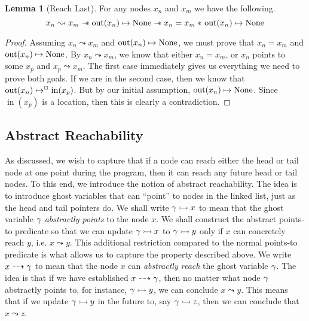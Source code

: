 \documentclass[a4paper, 10pt]{report}
\theoremstyle{definition}
\newtheorem{lemma}[theorem]{Lemma}
\newcommand{\nIn}[1]{\operatorname{in}(#1)}
\newcommand{\nOut}[1]{\operatorname{out}(#1)}
\newcommand{\node}{x}
\newcommand{\nodeM}[1]{\node_{#1}}
\newcommand{\reach}[2]{#1 \leadsto #2}
\newcommand{\ar}[2]{#1 \dashrightarrow #2}
\newcommand{\ap}[2]{#1 \rightarrowtail #2}
\begin{document}
\begin{lemma}[Reach Last]\label{lemma:reach-last}
  For any nodes $\nodeM{n}$ and $\nodeM{m}$ we have the following.
  \begin{equation*}
    \reach{\nodeM{n}}{\nodeM{m}} \wand \nOut{\nodeM{n}} \mapsto \None \wand \nodeM{n} = \nodeM{m} \star{} \nOut{\nodeM{n}} \mapsto \None
  \end{equation*}
\end{lemma}
\begin{proof}
  Assuming $\reach{\nodeM{n}}{\nodeM{m}}$ and $\nOut{\nodeM{n}} \mapsto \None$, we must prove that $\nodeM{n} = \nodeM{m}$ and $\nOut{\nodeM{n}} \mapsto \None$.
  By $\reach{\nodeM{n}}{\nodeM{m}}$, we know that either $\nodeM{n} = \nodeM{m}$, or $\nodeM{n}$ points to some $\nodeM{p}$ and $\reach{\nodeM{p}}{\nodeM{m}}$. The first case immediately gives us everything we need to prove both goals. If we are in the second case, then we know that $\nOut{\nodeM{n}} \mapsto^{\persistently} \nIn{\nodeM{p}}$. But by our initial assumption, $\nOut{\nodeM{n}} \mapsto \None$. Since $\nIn{\nodeM{p}}$ is a location, then this is clearly a contradiction.
\end{proof}


\subsection{Abstract Reachability}

As discussed, we wish to capture that if a node can reach either the head or tail node at one point during the program, then it can reach any future head or tail nodes. To this end, we introduce the notion of abstract reachability. The idea is to introduce ghost variables that can ``point'' to nodes in the linked list, just as the head and tail pointers do. We shall write $\ap{\gname}{x}$ to mean that the ghost variable $\gamma$ \emph{abstractly points} to the node $x$. We shall construct the abstract points-to predicate so that we can update $\ap{\gname}{x}$ to $\ap{\gname}{y}$ only if $x$ can concretely reach $y$, i.e. $\reach{x}{y}$. This additional restriction compared to the normal points-to predicate is what allows us to capture the property described above. We write $\ar{x}{\gname}$ to mean that the node $x$ can \emph{abstractly reach} the ghost variable $\gamma$. The idea is that if we have established $\ar{x}{\gname}$, then no matter what node $\gamma$ abstractly points to, for instance, $\ap{\gname}{y}$, we can conclude $\reach{x}{y}$. This means that if we update $\ap{\gname}{y}$ in the future to, say $\ap{\gname}{z}$, then we can conclude that $\reach{x}{z}$.
\end{document}
